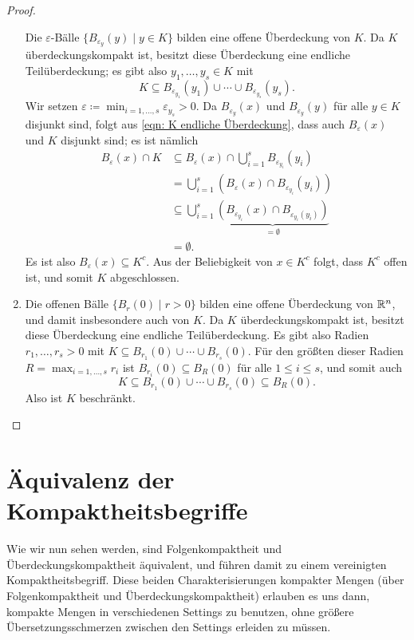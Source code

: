 \documentclass[a4paper,10pt]{article}
\begin{document}
\begin{proof}
\begin{enumerate}
   Die $\varepsilon$-Bälle $\{B_{\varepsilon_y}(y) \mid y \in K\}$ bilden eine offene Überdeckung von $K$. Da $K$ überdeckungskompakt ist, besitzt diese Überdeckung eine endliche Teilüberdeckung; es gibt also $y_1, \dotsc, y_s \in K$ mit
   \begin{equation}\label{eqn: K endliche Überdeckung}
    K \subseteq B_{\varepsilon_{y_1}}(y_1) \cup \dotsb \cup B_{\varepsilon_{y_s}}(y_s).
   \end{equation}
   Wir setzen $\varepsilon \coloneqq \min_{i=1,\dotsc,s} \varepsilon_{y_s} > 0$. Da $B_{\varepsilon_y}(x)$ und $B_{\varepsilon_y}(y)$ für alle $y \in K$ disjunkt sind, folgt aus \eqref{eqn: K endliche Überdeckung}, dass auch $B_\varepsilon(x)$ und $K$ disjunkt sind; es ist nämlich
   \begin{align*}
    B_\varepsilon(x) \cap K
    &\subseteq B_\varepsilon(x) \cap \bigcup_{i=1}^s B_{\varepsilon_{y_i}}(y_i) \\
    &= \bigcup_{i=1}^s (B_\varepsilon(x) \cap B_{\varepsilon_{y_i}}(y_i)) \\
    &\subseteq \bigcup_{i=1}^s \underbrace{(B_{\varepsilon_{y_i}}(x) \cap B_{\varepsilon_{y_i}(y_i)})}_{= \emptyset} \\
    &= \emptyset.
   \end{align*}
   Es ist also $B_\varepsilon(x) \subseteq K^c$. Aus der Beliebigkeit von $x \in K^c$ folgt, dass $K^c$ offen ist, und somit $K$ abgeschlossen.
  \item
   Die offenen Bälle $\{B_r(0) \mid r > 0\}$ bilden eine offene Überdeckung von $\mathbb{R}^n$, und damit insbesondere auch von $K$. Da $K$ überdeckungskompakt ist, besitzt diese Überdeckung eine endliche Teilüberdeckung. Es gibt also Radien $r_1, \dotsc, r_s > 0$ mit $K \subseteq B_{r_1}(0) \cup \dotsb \cup B_{r_s}(0)$. Für den größten dieser Radien $R = \max_{i=1,\dotsc,s} r_i$ ist $B_{r_i}(0) \subseteq B_R(0)$ für alle $1 \leq i \leq s$, und somit auch
   \[
    K \subseteq B_{r_1}(0) \cup \dotsb \cup B_{r_s}(0) \subseteq B_R(0).
   \]
   Also ist $K$ beschränkt.
  \qedhere
 \end{enumerate}
\end{proof}





\section{Äquivalenz der Kompaktheitsbegriffe}
Wie wir nun sehen werden, sind Folgenkompaktheit und Überdeckungskompaktheit äquivalent, und führen damit zu einem vereinigten Kompaktheitsbegriff. Diese beiden Charakterisierungen kompakter Mengen (über Folgenkompaktheit und Überdeckungskompaktheit) erlauben es uns dann, kompakte Mengen in verschiedenen Settings zu benutzen, ohne größere Übersetzungsschmerzen zwischen den Settings erleiden zu müssen.
\end{document}
